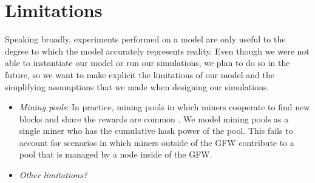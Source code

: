 \section{Limitations}
Speaking broadly, experiments performed on a model are only useful to the degree to which the model accurately represents reality. Even though we were not able to instantiate our model or run our simulations, we plan to do so in the future, so we want to make explicit the limitations of our model and the simplifying assumptions that we made when designing our simulations. 

\begin{itemize}
	
	\item \textit{Mining pools}: In practice, mining pools in which miners cooperate to find new blocks and share the rewards are common \cite{Rosenfeld}. We model mining pools as a single miner who has the cumulative hash power of the pool. This fails to account for scenarios in which miners outside of the GFW contribute to a pool that is managed by a node inside of the GFW.
	\item \textit{Other limitations?}
\end{itemize}


